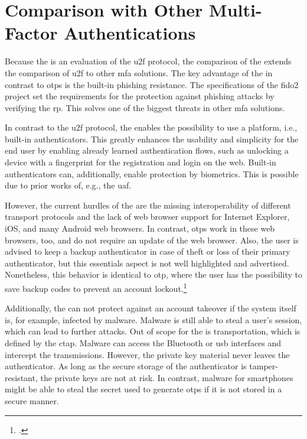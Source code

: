 \section{Comparison with Other Multi-Factor Authentications}
\label{chapter:comparison}

Because the \wa{} is an evaluation of the \gls{u2f} protocol, the comparison of the \wa{} extends the comparison of \gls{u2f} to other \gls{mfa} solutions. The key advantage of the \wa{} in contrast to \glspl{otp} is the built-in phishing resistance. The specifications of the \gls{fido}2 project set the requirements for the protection against phishing attacks by verifying the \gls{rp}. This solves one of the biggest threats in other \gls{mfa} solutions.

In contrast to the \gls{u2f} protocol, the \wa{} enables the possibility to use a platform, i.e., built-in authenticators. This greatly enhances the usability and simplicity for the end user by enabling already learned authentication flows, such as unlocking a device with a fingerprint for the registration and login on the web. Built-in authenticators can, additionally, enable protection by biometrics. This is possible due to prior works of, e.g., the \gls{uaf}.

 However, the current hurdles of the \wa{} are the missing interoperability of different transport protocols and the lack of web browser support for Internet Explorer, iOS, and many Android web browsers. In contrast, \glspl{otp} work in these web browsers, too, and do not require an update of the web browser. Also, the user is advised to keep a backup authenticator in case of theft or loss of their primary authenticator, but this essentials aspect is not well highlighted and advertised. Nonetheless, this behavior is identical to \gls{otp}, where the user has the possibility to save backup codes to prevent an account lockout.\footcites[See][36]{10.1007/978-3-319-45931-8_3}
 
 Additionally, the \wa{} can not protect against an account takeover if the system itself is, for example, infected by malware. Malware is still able to steal a user's session, which can lead to further attacks. Out of scope for the \wa{} is transportation, which is defined by the \gls{ctap}. Malware can access the Bluetooth or \gls{usb} interfaces and intercept the transmissions. However, the private key material never leaves the authenticator. As long as the secure storage of the authenticator is tamper-resistant, the private keys are not at risk. In contrast, malware for smartphones might be able to steal the secret used to generate \glspl{otp} if it is not stored in a secure manner.
 
